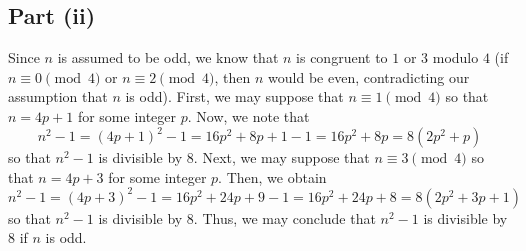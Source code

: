 \documentclass[12pt]{article}
\begin{document}
\subsection*{Part (ii)}
Since $n$ is assumed to be odd, we know that $n$ is congruent to $1$ or $3$ modulo $4$ (if $n \equiv 0 \pmod{4}$ or $n \equiv 2 \pmod{4}$, then $n$ would be even, contradicting our assumption that $n$ is odd). First, we may suppose that $n \equiv 1 \pmod{4}$ so that $n = 4p + 1$ for some integer $p$. Now, we note that
\[
n^2 - 1 = (4p+1)^2 - 1 = 16p^2 + 8p + 1 - 1 = 16p^2 + 8p = 8(2p^2+p)
\] so that $n^2 - 1$ is divisible by $8$. Next, we may suppose that $n \equiv 3 \pmod{4}$ so that $n = 4p + 3$ for some integer $p$. Then, we obtain
\[
n^2 - 1 = (4p+3)^2 - 1 = 16p^2 + 24p + 9 - 1 = 16p^2 + 24p + 8 = 8(2p^2 + 3p + 1)
\] so that $n^2 - 1$ is divisible by $8$. Thus, we may conclude that $n^2-1$ is divisible by $8$ if $n$ is odd.
\newpage
\end{document}
